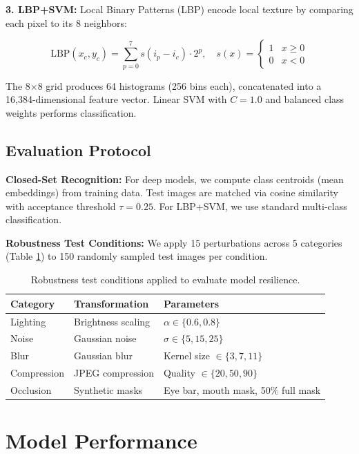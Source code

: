 \documentclass[11pt,a4paper]{article}
\begin{document}
\textbf{3. LBP+SVM:} Local Binary Patterns (LBP) encode local texture by comparing each pixel to its 8 neighbors:

\begin{equation}
    \text{LBP}(x_c, y_c) = \sum_{p=0}^{7} s(i_p - i_c) \cdot 2^p, \quad s(x) = \begin{cases} 1 & x \geq 0 \\ 0 & x < 0 \end{cases}
\end{equation}

The 8×8 grid produces 64 histograms (256 bins each), concatenated into a 16,384-dimensional feature vector. Linear SVM with $C=1.0$ and balanced class weights performs classification.

\subsection{Evaluation Protocol}

\textbf{Closed-Set Recognition:} For deep models, we compute class centroids (mean embeddings) from training data. Test images are matched via cosine similarity with acceptance threshold $\tau=0.25$. For LBP+SVM, we use standard multi-class classification.

\textbf{Robustness Test Conditions:} We apply 15 perturbations across 5 categories (Table \ref{tab:perturbations}) to 150 randomly sampled test images per condition.

\begin{table}[H]
\centering
\caption{Robustness test conditions applied to evaluate model resilience.}
\label{tab:perturbations}
\begin{tabular}{@{}lll@{}}
\toprule
\textbf{Category} & \textbf{Transformation} & \textbf{Parameters} \\ \midrule
Lighting & Brightness scaling & $\alpha \in \{0.6, 0.8\}$ \\
Noise & Gaussian noise & $\sigma \in \{5, 15, 25\}$ \\
Blur & Gaussian blur & Kernel size $\in \{3, 7, 11\}$ \\
Compression & JPEG compression & Quality $\in \{20, 50, 90\}$ \\
Occlusion & Synthetic masks & Eye bar, mouth mask, 50\% full mask \\ \bottomrule
\end{tabular}
\end{table}

\section{Model Performance}
\end{document}
